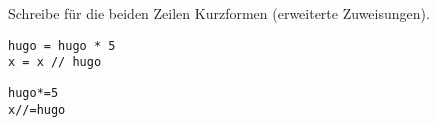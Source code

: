 \question[2]
Schreibe für die beiden Zeilen Kurzformen (erweiterte Zuweisungen).
\begin{lstlisting}
hugo = hugo * 5
x = x // hugo
\end{lstlisting}
\begin{solutionbox}{2cm}
\begin{lstlisting}
hugo*=5
x//=hugo
\end{lstlisting}
\end{solutionbox}
